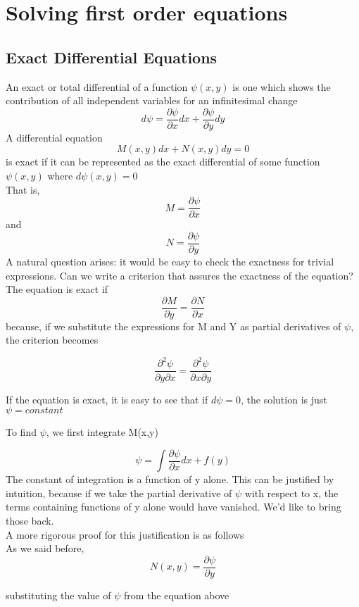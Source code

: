 \documentclass{article}
\begin{document}
	\section{Solving first order equations}
	\subsection*{Exact Differential Equations}
	An exact or total differential of a function $\psi(x,y)$ is one which shows the contribution of all independent variables for an infinitesimal change
	\begin{equation}
	d\psi = \frac{\partial\psi}{\partial x}dx + \frac{\partial\psi}{\partial y}dy
	\end{equation}
	A differential equation
	$$M(x,y)dx + N(x,y)dy = 0$$ is exact if it can be represented as the exact differential of some function $\psi (x,y)$ where $d\psi (x,y) = 0$
	\\
	That is,
	$$M = \frac{\partial\psi}{\partial x} $$ and $$N = \frac{\partial\psi}{\partial y} $$
	A natural question arises: it would be easy to check the exactness for trivial expressions. Can we write a criterion that assures the exactness of the equation?\\
	
	The equation is exact if
	$$ \frac{\partial M}{\partial y} = \frac{\partial N}{\partial x}$$
	because, if we substitute the expressions for M and Y as partial derivatives of $\psi$, the criterion becomes
	
	$$\frac{\partial^2\psi}{\partial y \partial x} = \frac{\partial^2\psi}{\partial x \partial y}$$
	
	If the equation is exact, it is easy to see that if $d\psi=0$, the solution is just $\psi = constant$
	
	To find $\psi$, we first integrate M(x,y)
	
	$$\psi = \int \frac{\partial \psi}{\partial x}dx + f(y)$$
	The constant of integration is a function of y alone. This can be justified by intuition, because if we take the partial derivative of $\psi$ with respect to x, the terms containing functions of y alone would have vanished. We'd like to bring those back.
	\\
	
	A more rigorous proof for this justification is as follows\\
	
	As we said before,
	$$ N(x,y) = \frac{\partial\psi}{\partial y}$$
	
	substituting the value of $\psi$ from the equation above
	 
\end{document}
